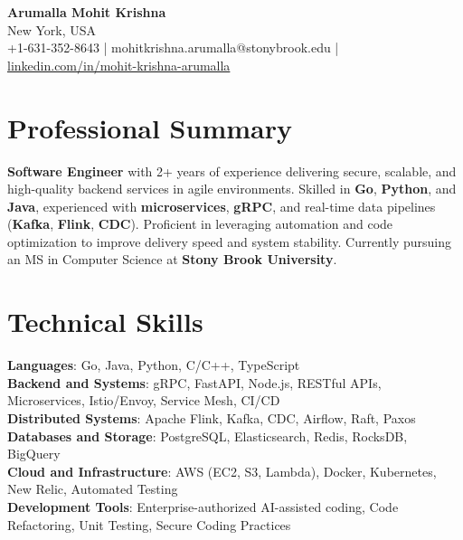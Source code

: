 \documentclass[letterpaper,11pt]{article}
\begin{document}
\begin{center}
  {\Large \textbf{Arumalla Mohit Krishna}} \\
  New York, USA \\
  +1-631-352-8643 \enspace | \enspace mohitkrishna.arumalla@stonybrook.edu \enspace | \enspace \href{https://www.linkedin.com/in/mohit-krishna-arumalla}{linkedin.com/in/mohit-krishna-arumalla}
\end{center}

\section{Professional Summary}
  \begin{itemize}[leftmargin=0.15in, label={}]
    \small{\item{
     \textbf{Software Engineer} with 2+ years of experience delivering secure, scalable, and high-quality backend services in agile environments. Skilled in \textbf{Go}, \textbf{Python}, and \textbf{Java}, experienced with \textbf{microservices}, \textbf{gRPC}, and real-time data pipelines (\textbf{Kafka}, \textbf{Flink}, \textbf{CDC}). Proficient in leveraging automation and code optimization to improve delivery speed and system stability. Currently pursuing an MS in Computer Science at \textbf{Stony Brook University}.
    }}
  \end{itemize}
\vspace{-16pt}

\section{Technical Skills}
 \begin{itemize}[leftmargin=0.15in, label={}]
    \small{\item{
     \textbf{Languages}: Go, Java, Python, C/C++, TypeScript \\
     \textbf{Backend and Systems}: gRPC, FastAPI, Node.js, RESTful APIs, Microservices, Istio/Envoy, Service Mesh, CI/CD \\
     \textbf{Distributed Systems}: Apache Flink, Kafka, CDC, Airflow, Raft, Paxos \\
     \textbf{Databases and Storage}: PostgreSQL, Elasticsearch, Redis, RocksDB, BigQuery \\
     \textbf{Cloud and Infrastructure}: AWS (EC2, S3, Lambda), Docker, Kubernetes, New Relic, Automated Testing \\
     \textbf{Development Tools}: Enterprise-authorized AI-assisted coding, Code Refactoring, Unit Testing, Secure Coding Practices
    }}
 \end{itemize}
\vspace{-16pt}
\end{document}
